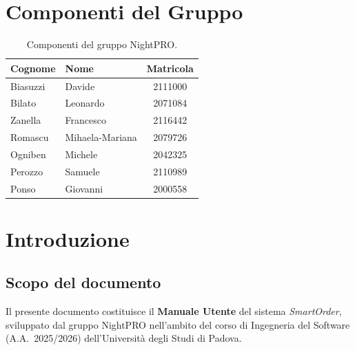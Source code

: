 \documentclass[a4paper, 11pt, oneside]{scrartcl}
\begin{document}
\newpage
\tableofcontents
\listoffigures
\listoftables
\pagestyle{fancy}

\newpage
\section*{Componenti del Gruppo}

\begin{table}[H]
    \centering
    \renewcommand{\arraystretch}{1.2}
    \begin{tabular}{@{}llc@{}}
        \toprule
        \textbf{Cognome} & \textbf{Nome}   & \textbf{Matricola} \\
        \midrule
        Biasuzzi         & Davide          & 2111000            \\
        Bilato           & Leonardo        & 2071084            \\
        Zanella          & Francesco       & 2116442            \\
        Romascu          & Mihaela-Mariana & 2079726            \\
        Ogniben          & Michele         & 2042325            \\
        Perozzo          & Samuele         & 2110989            \\
        Ponso            & Giovanni        & 2000558            \\
        \bottomrule
    \end{tabular}
    \caption{Componenti del gruppo NightPRO.}
\end{table}

\newpage
\section{Introduzione}

\subsection{Scopo del documento}
Il presente documento costituisce il \textbf{Manuale Utente} del sistema \textit{SmartOrder}, sviluppato dal gruppo NightPRO nell'ambito del corso di Ingegneria del Software (A.A.\ 2025/2026) dell'Universit\`a degli Studi di Padova.
\end{document}
